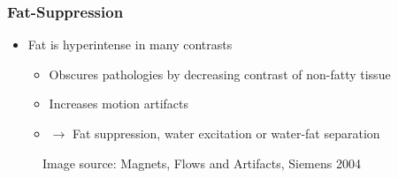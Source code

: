 \begin{frame}
\frametitle{Fat-Suppression}

\begin{itemize}
		\item Fat is hyperintense in many contrasts
			\begin{itemize}
		\item Obscures pathologies by decreasing contrast of non-fatty tissue
		\item Increases motion artifacts
		\item $\rightarrow$ Fat suppression, water excitation or water-fat separation
		\end{itemize}
\end{itemize}

	\begin{figure}
		\centering
				\vspace{-2.5ex}
		\caption*{\scriptsize Image source: Magnets, Flows and Artifacts, Siemens 2004}
	\end{figure}

\end{frame}

